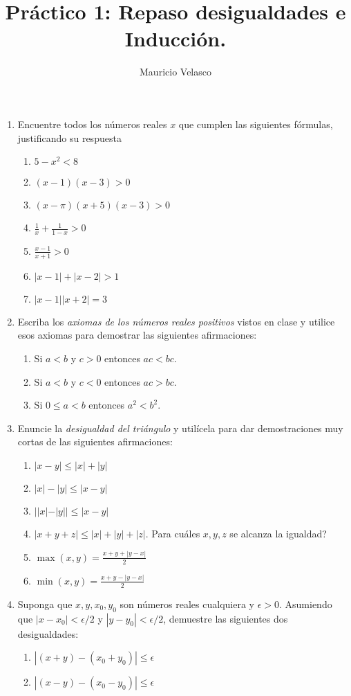 \documentclass[12pt, a4paper]{article}
\date{}
\begin{document}
\title{Pr\'actico 1: Repaso desigualdades e Inducción.}
\author{Mauricio Velasco}
\maketitle{}
\begin{enumerate} 
\item Encuentre todos los números reales $x$ que cumplen las siguientes fórmulas, justificando su respuesta

\begin{enumerate}
\item $5-x^2<8$
\item $(x-1)(x-3)>0$
\item $(x-\pi)(x+5)(x-3)>0$
\item $\frac{1}{x}+\frac{1}{1-x}>0$
\item $\frac{x-1}{x+1}>0$
\item $|x-1|+|x-2|>1$
\item $|x-1||x+2|=3$
\end{enumerate}

\item Escriba los \emph{axiomas de los números reales positivos} vistos en clase y utilice esos axiomas para demostrar las siguientes afirmaciones:
\begin{enumerate}
\item Si $a<b$ y $c>0$ entonces $ac<bc$.
\item Si $a<b$ y $c<0$ entonces $ac>bc$.
\item Si $0\leq a<b$ entonces $a^2<b^2$.
\end{enumerate}

\item Enuncie la \emph{desigualdad del triángulo} y utilícela para dar demostraciones muy cortas de las siguientes afirmaciones:
\begin{enumerate}
\item $|x-y|\leq |x|+|y|$
\item $|x|-|y|\leq |x-y|$
\item $||x|-|y||\leq |x-y|$ 
\item $|x+y+z|\leq |x|+|y|+|z|$. Para cuáles $x,y,z$ se alcanza la igualdad? 
\item $\max(x,y)=\frac{x+y+|y-x|}{2}$
\item $\min(x,y)=\frac{x+y-|y-x|}{2}$
\end{enumerate}

\item Suponga que $x,y,x_0,y_0$ son números reales cualquiera y $\epsilon>0$. 
Asumiendo que $|x-x_0|<\epsilon/2$ y $|y-y_0|<\epsilon/2$, demuestre las siguientes dos desigualdades:
\begin{enumerate}
\item $|(x+y)-(x_0+y_0)|\leq \epsilon$
\item $|(x-y)-(x_0-y_0)|\leq \epsilon$
\end{enumerate}
  

\end{enumerate}
\end{document}
